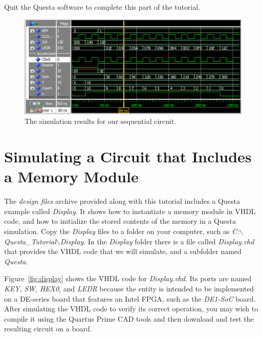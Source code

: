 \documentclass[11pt, twoside, pdftex]{article}
\begin{document}
\noindent
Quit the Questa software to complete this part of the tutorial.

\begin{figure}[h!]
	\begin{center}
		\includegraphics[width = \textwidth]{figures/gui3.png}
	\end{center}
		  \caption{The simulation results for our sequential circuit.}
	\label{fig:gui3}
\end{figure}

\section{Simulating a Circuit that Includes a Memory Module}

The {\it design files} archive provided along with this tutorial includes a Questa example 
called {\it Display}. It shows how to instantiate a memory module in VHDL code, and how
to initialize the stored contents of the memory in a Questa simulation. Copy the {\it Display}
files to a folder on your computer, such as 
{\it C:$\backslash$Questa\_Tutorial$\backslash$Display}. 
In the {\it Display} folder there is a file called {\it Display.vhd}
that provides the VHDL code that we will simulate, and 
a subfolder named {\it Questa}.

\noindent
Figure~\ref{fig:display} shows the VHDL code for {\it Display.vhd}.
Its ports are named {\it KEY}, {\it SW}, {\it HEX0}, and {\it LEDR} because the entity is intended 
to be implemented on a DE-series board that features an Intel FPGA, such as the {\it DE1-SoC}
board. After simulating the VHDL code to verify its correct operation, you may
wish to compile it using the Quartus Prime CAD tools and then download and test the 
resulting circuit on a board.  
\end{document}
